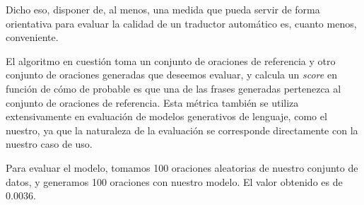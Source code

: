 Dicho eso, disponer de, al menos, una medida que pueda servir de forma orientativa para evaluar la calidad de un traductor automático es, cuanto menos, conveniente.

El algoritmo en cuestión toma un conjunto de oraciones de referencia y otro conjunto de oraciones generadas que deseemos evaluar, y calcula un \textit{score} en función de cómo de probable es que una de las frases generadas pertenezca al conjunto de oraciones de referencia. Esta métrica también se utiliza extensivamente en evaluación de modelos generativos de lenguaje, como el nuestro, ya que la naturaleza de la evaluación se corresponde directamente con la nuestro caso de uso.


Para evaluar el modelo, tomamos 100 oraciones aleatorias de nuestro conjunto de datos, y generamos 100 oraciones con nuestro modelo. El valor obtenido es de 0.0036. 

